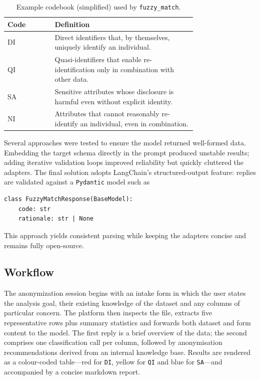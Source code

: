\documentclass{article}
\begin{document}
\begin{table}[h]
    \centering
    \begin{tabular}{lp{0.75\linewidth}}
        \hline
        \textbf{Code} & \textbf{Definition}\\
        \hline
        DI & Direct identifiers that, by themselves, uniquely identify an individual.\\
        QI & Quasi-identifiers that enable re-identification only in combination with other data.\\
        SA & Sensitive attributes whose disclosure is harmful even without explicit identity.\\
        NI & Attributes that cannot reasonably re-identify an individual, even in combination.\\
        \hline
    \end{tabular}
    \caption{Example codebook (simplified) used by \texttt{fuzzy\_match}.}
    \label{tab:fuzzy-codebook}
\end{table}

Several approaches were tested to ensure the model returned well-formed data.  Embedding the target schema directly in the prompt produced unstable results; adding iterative validation loops improved reliability but quickly cluttered the adapters.  The final solution adopts LangChain’s structured-output feature: replies are validated against a \texttt{Pydantic} model such as
\begin{verbatim}
class FuzzyMatchResponse(BaseModel):
    code: str
    rationale: str | None
\end{verbatim}
This approach yields consistent parsing while keeping the adapters concise and remains fully open-source.

\subsection{Workflow}

The anonymization session begins with an intake form in which the user states the analysis goal, their existing knowledge of the dataset and any columns of particular concern.  The platform then inspects the file, extracts five representative rows plus summary statistics and forwards both dataset and form content to the model.  The first reply is a brief overview of the data; the second comprises one classification call per column, followed by anonymisation recommendations derived from an internal knowledge base.  Results are rendered as a colour-coded table—red for \texttt{DI}, yellow for \texttt{QI} and blue for \texttt{SA}—and accompanied by a concise markdown report.
\end{document}

